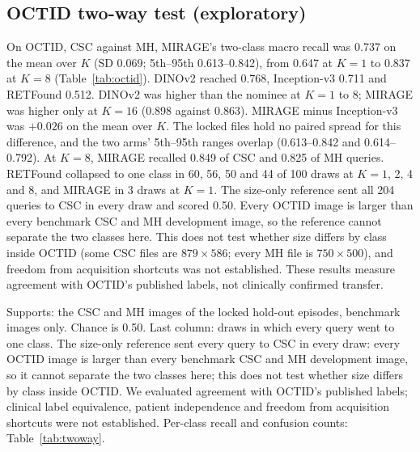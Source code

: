 \documentclass[conference]{IEEEtran}
\begin{document}
\subsection{OCTID two-way test (exploratory)}
\label{sec:res-octid}
On OCTID, CSC against MH, MIRAGE's two-class macro recall was 0.737 on the mean over $K$ (SD 0.069; 5th--95th 0.613--0.842), from 0.647 at $K=1$ to 0.837 at $K=8$ (Table~\ref{tab:octid}). DINOv2 reached 0.768, Inception-v3 0.711 and RETFound 0.512. DINOv2 was higher than the nominee at $K=1$ to 8; MIRAGE was higher only at $K=16$ (0.898 against 0.863).
MIRAGE minus Inception-v3 was $+0.026$ on the mean over $K$. The locked files hold no paired spread for this difference, and the two arms' 5th--95th ranges overlap (0.613--0.842 and 0.614--0.792). At $K=8$, MIRAGE recalled 0.849 of CSC and 0.825 of MH queries. RETFound collapsed to one class in 60, 56, 50 and 44 of 100 draws at $K=1$, 2, 4 and 8, and MIRAGE in 3 draws at $K=1$.
The size-only reference sent all 204 queries to CSC in every draw and scored 0.50. Every OCTID image is larger than every benchmark CSC and MH development image, so the reference cannot separate the two classes here. This does not test whether size differs by class inside OCTID (some CSC files are $879\times586$; every MH file is $750\times500$), and freedom from acquisition shortcuts was not established. These results measure agreement with OCTID's published labels, not clinically confirmed transfer.

\begin{table}[t]
\caption{OCTID central serous chorioretinopathy (OCTID ``CSR'') against macular hole, two-way (exploratory): 102 + 102 queries; macro recall over the two classes, mean of 100 draws.}
\label{tab:octid}
\centering\footnotesize

\par\smallskip
\parbox{\textwidth}{\footnotesize Supports: the CSC and MH images of the locked hold-out episodes, benchmark images only. Chance is 0.50. Last column: draws in which every query went to one class. The size-only reference sent every query to CSC in every draw: every OCTID image is larger than every benchmark CSC and MH development image, so it cannot separate the two classes here; this does not test whether size differs by class inside OCTID. We evaluated agreement with OCTID's published labels; clinical label equivalence, patient independence and freedom from acquisition shortcuts were not established. Per-class recall and confusion counts: Table~\ref{tab:twoway}.}
\end{table}
\end{document}
